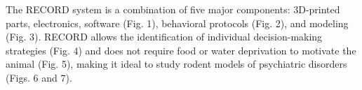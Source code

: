 \documentclass{article}
\begin{document}
\vspace{1em}

The RECORD system is a combination of five major components: 3D-printed parts, electronics, software (Fig. 1), behavioral protocols (Fig. 2), and modeling (Fig. 3). RECORD allows the identification of individual decision-making strategies (Fig. 4) and does not require food or water deprivation to motivate the animal (Fig. 5), making it ideal to study rodent models of psychiatric disorders (Figs. 6 and  7).

\clearpage


\end{document}
